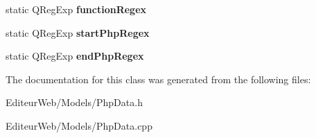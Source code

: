 \begin{DoxyCompactItemize}
\item 
\hypertarget{class_php_data_aef4ccd2f09d5638a3c56b86ae7def8d5}{
static QRegExp {\bfseries functionRegex}}
\label{class_php_data_aef4ccd2f09d5638a3c56b86ae7def8d5}

\item 
\hypertarget{class_php_data_ab15e745bbac3984fda2faf7ce8d5517c}{
static QRegExp {\bfseries startPhpRegex}}
\label{class_php_data_ab15e745bbac3984fda2faf7ce8d5517c}

\item 
\hypertarget{class_php_data_ad3b30f505637b92ab195f2da72ec013c}{
static QRegExp {\bfseries endPhpRegex}}
\label{class_php_data_ad3b30f505637b92ab195f2da72ec013c}

\end{DoxyCompactItemize}


The documentation for this class was generated from the following files:\begin{DoxyCompactItemize}
\item 
EditeurWeb/Models/PhpData.h\item 
EditeurWeb/Models/PhpData.cpp\end{DoxyCompactItemize}
